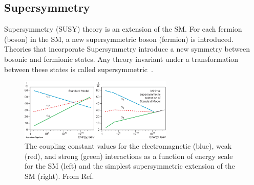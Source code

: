 \subsection{Supersymmetry\label{sec:SUSY}}

Supersymmetry (SUSY) theory is an extension of the SM. For each fermion (boson) in
the SM, a new supersymmetric boson (fermion) is introduced. Theories that incorporate 
Supersymmetry introduce a new symmetry between bosonic and fermionic states. 
Any theory invariant under a transformation between these states is called 
supersymmetric~\cite{ramond1999journeys}.

\begin{figure}[h!t]
  \begin{center}
       \includegraphics[width=0.65\textwidth,]{figures/phypub4highen.jpg}
       \caption{The coupling constant values for the electromagnetic (blue), weak (red), 
       and strong (green) interactions as a function of energy scale for the SM (left) and the simplest 
       supersymmetric extension of the SM (right). From Ref.~\cite{Nobelprize.org2004}}
    \label{fig:runningConstants}
  \end{center}
\end{figure}


